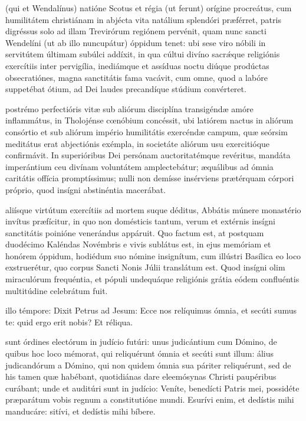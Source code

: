 \documentclass[fontsize=9pt,paper=A6,twoside,BCOR=1mm,DIV=22,headinclude]{scrarticle}
\begin{document}
\begin{multicols}{2}
{}

 (qui et Wendalínus) natióne Scotus et régia (ut ferunt) orígine procreátus, cum humilitátem christiánam in abjécta vita natálium splendóri præférret, patris digréssus solo ad illam Trevirórum regiónem pervénit, quam nunc sancti Wendelíni (ut ab illo nuncupátur) óppidum tenet: ubi sese viro nóbili in servitútem últimam subúlci addíxit, in qua cúltui divíno sacr\'æque religiónis exercítiis inter pervigília, inediámque et assíduas noctu diúque prodúctas obsecratiónes, magna sanctitátis fama vacávit, cum omne, quod a labóre suppetébat ótium, ad Dei laudes precandíque stúdium convérteret.

\RVCiv 

 postrémo perfectióris vitæ sub aliórum disciplína transigéndæ amóre inflammátus, in Tholojénse cœnóbium concéssit, ubi latiórem nactus in aliórum consórtio et sub aliórum império humilitátis exercéndæ campum, quæ seórsim meditátus erat abjectiónis exémpla, in societáte aliórum usu exercitióque confirmávit. In superióribus Dei persónam auctoritatémque revéritus, mandáta imperántium ceu divínam voluntátem amplectebátur; æquálibus ad ómnia caritátis offícia promptíssimus; nulli non demísse insérviens prætérquam córpori próprio, quod insígni abstinéntia macerábat.

\RVCv 

 aliísque virtútum exercítiis ad mortem suque déditus, Abbátis múnere monastério invítus præfícitur, in quo non domésticis tantum, verum et extérnis insígni sanctitátis poinióne venerándus appáruit. Quo factum est, at postquam duodécimo Kaléndas Novémbris e vivis sublátus est, in ejus memóriam et honórem óppidum, hodiédum suo nómine insignítum, cum illústri Basílica eo loco exstruerétur, quo corpus Sancti Nonis Júlii translátum est. Quod insígni olim miraculórum frequéntia, et pópuli undequáque religiónis grátia eódem confluéntis multitúdine celebrátum fuit.

\RVCvi 

 illo témpore: Dixit Petrus ad Jesum: Ecce nos relíquimus ómnia, et secúti sumus te: quid ergo erit nobis? Et réliqua.

 sunt órdines electórum in judício futúri: unus judicántium cum Dómino, de quibus hoc loco mémorat, qui reliquérunt ómnia et secúti sunt illum: álius judicandórum a Dómino, qui non quidem ómnia sua páriter reliquérunt, sed de his tamen quæ habébant, quotidiánas dare eleemósynas Christi paupéribus curábant; unde et auditúri sunt in judício: Veníte, benedícti Patris mei, possidéte præparátum vobis regnum a constitutióne mundi. Esurívi enim, et dedístis mihi manducáre: sitívi, et dedístis mihi bíbere.


\end{multicols}
\end{document}
